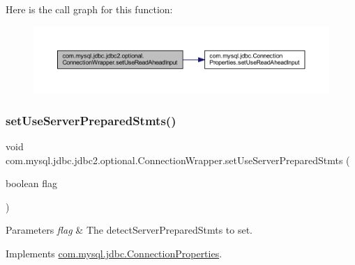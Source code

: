 Here is the call graph for this function\+:
\nopagebreak
\begin{figure}[H]
\begin{center}
\leavevmode
\includegraphics[width=350pt]{classcom_1_1mysql_1_1jdbc_1_1jdbc2_1_1optional_1_1_connection_wrapper_ae880ea3eac682792cff918e06fddbb3b_cgraph}
\end{center}
\end{figure}
\mbox{\label{classcom_1_1mysql_1_1jdbc_1_1jdbc2_1_1optional_1_1_connection_wrapper_a87cc13b16614e7a9ab998e64518d35bd}} 
\subsubsection{\texorpdfstring{set\+Use\+Server\+Prepared\+Stmts()}{setUseServerPreparedStmts()}}
{\footnotesize\ttfamily void com.\+mysql.\+jdbc.\+jdbc2.\+optional.\+Connection\+Wrapper.\+set\+Use\+Server\+Prepared\+Stmts (\begin{DoxyParamCaption}\item[{boolean}]{flag }\end{DoxyParamCaption})}


\begin{DoxyParams}{Parameters}
{\em flag} & The detect\+Server\+Prepared\+Stmts to set. \\
\hline
\end{DoxyParams}


Implements \mbox{\hyperlink{interfacecom_1_1mysql_1_1jdbc_1_1_connection_properties_ace9e4d9927b8eb7afd57054f4adf6316}{com.\+mysql.\+jdbc.\+Connection\+Properties}}.


